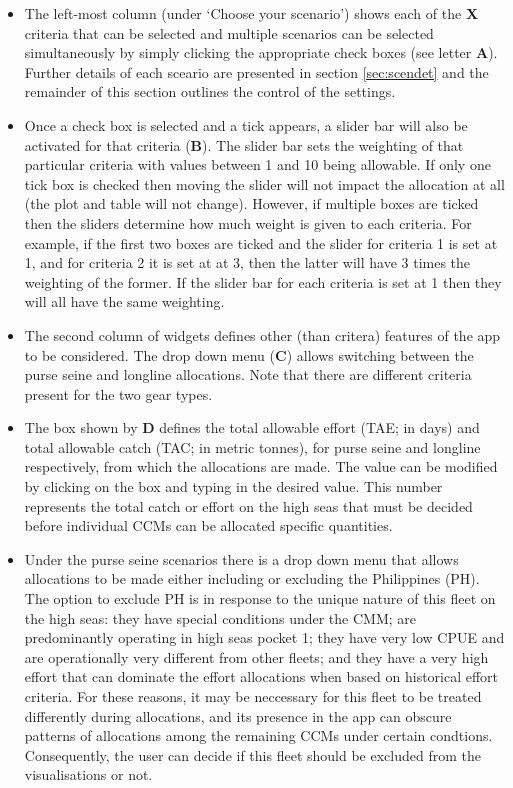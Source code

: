 \documentclass[11pt]{article}
\begin{document}
\begin{itemize}
\item The left-most column (under `Choose your scenario') shows each of the {\bf X} criteria that can be selected and multiple scenarios can be selected simultaneously by simply clicking the appropriate check boxes (see letter {\bf A}). Further details of each sceario are presented in section \ref{sec:scendet} and the remainder of this section outlines the control of the settings.
\item Once a check box is selected and a tick appears, a slider bar will also be activated for that criteria ({\bf B}). The slider bar sets the weighting of that particular criteria with values between 1 and 10 being allowable. If only one tick box is checked then moving the slider will not impact the allocation at all (the plot and table will not change). However, if multiple boxes are ticked then the sliders determine how much weight is given to each criteria. For example, if the first two boxes are ticked and the slider for criteria 1 is set at 1, and for criteria 2 it is set at at 3, then the latter will have 3 times the weighting of the former. If the slider bar for each criteria is set at 1 then they will all have the same weighting.
\item The second column of widgets defines other (than critera) features of the app to be considered. The drop down menu ({\bf C}) allows switching between the purse seine and longline allocations. Note that there are different criteria present for the two gear types.
\item The box shown by {\bf D} defines the total allowable effort (TAE; in days) and total allowable catch (TAC; in metric tonnes), for purse seine and longline respectively, from which the allocations are made. The value can be modified by clicking on the box and typing in the desired value. This number represents the total catch or effort on the high seas that must be decided before individual CCMs can be allocated specific quantities.
\item Under the purse seine scenarios there is a drop down menu that allows allocations to be made either including or excluding the Philippines (PH). The option to exclude PH is in response to the unique nature of this fleet on the high seas: they have special conditions under the CMM; are predominantly operating in high seas pocket 1; they have very low CPUE and are operationally very different from other fleets; and they have a very high effort that can dominate the effort allocations when based on historical effort criteria. For these reasons, it may be neccessary for this fleet to be treated differently during allocations, and its presence in the app can obscure patterns of allocations among the remaining CCMs under certain condtions. Consequently, the user can decide if this fleet should be excluded from the visualisations or not.

\end{itemize}
\end{document}
